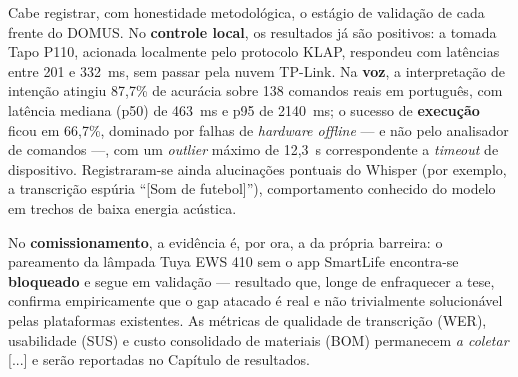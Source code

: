 Cabe registrar, com honestidade metodológica, o estágio de validação de cada
frente do DOMUS. No \textbf{controle local}, os resultados já são positivos: a
tomada Tapo P110, acionada localmente pelo protocolo KLAP, respondeu com latências
entre 201 e 332~ms, sem passar pela nuvem TP-Link. Na \textbf{voz}, a interpretação
de intenção atingiu 87,7\% de acurácia sobre 138 comandos reais em português,
com latência mediana (p50) de 463~ms e p95 de 2140~ms; o sucesso de
\textbf{execução} ficou em 66,7\%, dominado por falhas de \textit{hardware offline}
--- e não pelo analisador de comandos ---, com um \textit{outlier} máximo de 12,3~s
correspondente a \textit{timeout} de dispositivo. Registraram-se ainda alucinações
pontuais do Whisper (por exemplo, a transcrição espúria ``[Som de futebol]''),
comportamento conhecido do modelo em trechos de baixa energia acústica.

No \textbf{comissionamento}, a evidência é, por ora, a da própria barreira: o
pareamento da lâmpada Tuya EWS 410 sem o app SmartLife encontra-se
\textbf{bloqueado} e segue em validação --- resultado que, longe de enfraquecer a
tese, confirma empiricamente que o gap atacado é real e não trivialmente
solucionável pelas plataformas existentes. As métricas de qualidade de transcrição
(WER), usabilidade (SUS) e custo consolidado de materiais (BOM) permanecem
\textit{a coletar} [...] e serão reportadas no Capítulo de resultados.
